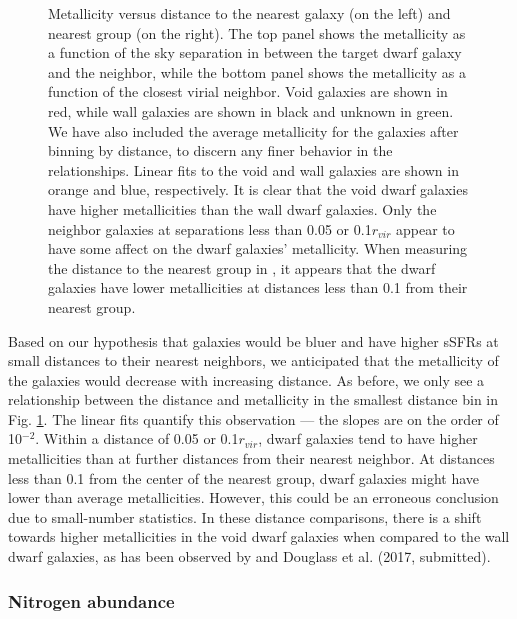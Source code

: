 \begin{figure}
    \caption[Metallicity versus distance to nearest neighbor and group]
    {Metallicity versus distance to the nearest galaxy (on the left) and nearest 
    group (on the right).  The top panel shows the metallicity as a function of 
    the sky separation in \hMpc between the target dwarf galaxy and the 
    neighbor, while the bottom panel shows the metallicity as a function of the 
    closest virial neighbor.  Void galaxies are shown in red, while wall 
    galaxies are shown in black and unknown in green.  We have also included the 
    average metallicity for the galaxies after binning by distance, to discern 
    any finer behavior in the relationships.  Linear fits to the void and wall 
    galaxies are shown in orange and blue, respectively.  It is clear that the 
    void dwarf galaxies have higher metallicities than the wall dwarf galaxies.  
    Only the neighbor galaxies at separations less than 0.05 \hMpc or 
    0.1$r_{vir}$ appear to have some affect on the dwarf galaxies' metallicity.  
    When measuring the distance to the nearest group in \hMpc, it appears that 
    the dwarf galaxies have lower metallicities at distances less than 0.1 \hMpc 
    from their nearest group.}
    \label{fig:OH}
\end{figure}

Based on our hypothesis that galaxies would be bluer and have higher sSFRs at 
small distances to their nearest neighbors, we anticipated that the metallicity 
of the galaxies would decrease with increasing distance.  As before, we only see 
a relationship between the distance and metallicity in the smallest distance 
bin in Fig. \ref{fig:OH}.  The linear fits quantify this observation --- the 
slopes are on the order of 10$^{-2}$.  Within a distance of 0.05 \hMpc or 
0.1$r_{vir}$, dwarf galaxies tend to have higher metallicities than at further 
distances from their nearest neighbor.  At distances less than 0.1 \hMpc from 
the center of the nearest group, dwarf galaxies might have lower than average 
metallicities.  However, this could be an erroneous conclusion due to 
small-number statistics.  In these distance comparisons, there is a shift 
towards higher metallicities in the void dwarf galaxies when compared to the 
wall dwarf galaxies, as has been observed by \cite{Douglass17b} and Douglass et 
al. (2017, submitted).  


\subsubsection{Nitrogen abundance}

